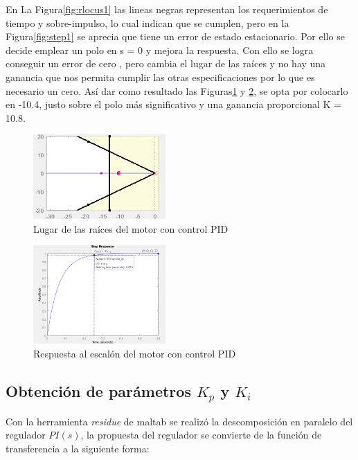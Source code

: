 \documentclass[conference]{IEEEtran}
\begin{document}
En La Figura\ref{fig:rlocus1} las lineas negras representan los requerimientos de tiempo y sobre-impulso, lo cual indican que se cumplen, pero en la Figura\ref{fig:step1} se aprecia que tiene un error de estado estacionario. Por ello se decide emplear un polo en s = 0 y mejora la respuesta.
Con ello se logra conseguir un error de cero , pero cambia el lugar de las raíces y no hay una ganancia que nos permita cumplir las otras especificaciones por lo que es necesario un cero. Así dar como resultado las Figuras\ref{fig:rlocus3} y \ref{fig:step4}, se opta por colocarlo en -10.4, justo sobre el polo más significativo y una ganancia proporcional K = 10.8. 

\begin{figure}[!h]
\centering
\includegraphics[width=0.45\textwidth]{images/rlocuspid.png}
\caption{Lugar de las raíces del motor con control PID}
\label{fig:rlocus3}
\end{figure}
\begin{figure}[!h]
\centering
\includegraphics[width=0.45\textwidth]{images/stepfinal.png}
\caption{Respuesta al escalón del motor con control PID}
\label{fig:step4}
\end{figure}


\subsection{Obtención de parámetros $K_p$ y $K_i$}

Con la herramienta \textit{residue} de maltab se realizó la descomposición en paralelo del regulador $PI(s)$, la propuesta del regulador se convierte de la función de transferencia a la siguiente forma:
\end{document}
